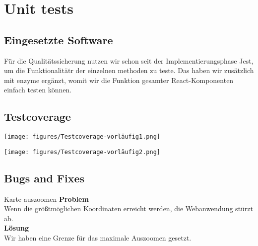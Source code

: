 \section{Unit tests}

\subsection{Eingesetzte Software}

Für die Qualitätssicherung nutzen wir schon seit der Implementierungsphase Jest, um die Funktionalitätr der einzelnen methoden zu teste. Das haben wir zusätzlich mit enzyme ergänzt, womit wir die Funktion gesamter React-Komponenten einfach testen können.

\subsection{Testcoverage}
\texttt{[image: figures/Testcoverage-vorläufig1.png]}\par\vspace{1cm}
\texttt{[image: figures/Testcoverage-vorläufig2.png]}\par\vspace{1cm}

\subsection{Bugs and Fixes}

\begin{Bug}{Karte auszoomen}
    \textbf{Problem}\\
    Wenn die größtmöglichen Koordinaten erreicht werden, die Webanwendung stürzt ab.\\
    \linebreak
    \textbf{Lösung}\\
    Wir haben eine Grenze für das maximale Auszoomen gesetzt.\\
\end{Bug}


